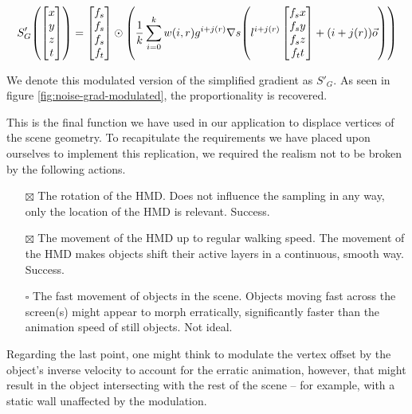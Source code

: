 \begin{equation}\label{eq:grad3}
    S'_G\mleft(\begin{bmatrix}x\\y\\z\\t\end{bmatrix}\mright) = \begin{bmatrix}f_s\\f_s\\f_s\\f_t\end{bmatrix} \odot \mleft( \frac{1}{k} \sum_{i=0}^{k} w(i, r) g^{i+j(r)} \nabla s\mleft(l^{i+j(r)} \begin{bmatrix}f_sx\\f_sy\\f_sz\\f_tt\end{bmatrix} + (i + j(r)) \vec{o}\mright) \mright)
\end{equation}

We denote this modulated version of the simplified gradient as $S'_G$. As seen in figure \ref{fig:noise-grad-modulated}, the proportionality is recovered.

This is the final function we have used in our application to displace vertices of the scene geometry. To recapitulate the requirements we have placed upon ourselves to implement this replication, we required the realism not to be broken by the following actions.

\begin{enumerate}
    \item[$\boxtimes$] The rotation of the \ac{HMD}. Does not influence the sampling in any way, only the location of the \ac{HMD} is relevant. Success.
    \item[$\boxtimes$] The movement of the \ac{HMD} up to regular walking speed. The movement of the \ac{HMD} makes objects shift their active layers in a continuous, smooth way. Success.
    \item[$\square$] The fast movement of objects in the scene. Objects moving fast across the screen(s) might appear to morph erratically, significantly faster than the animation speed of still objects. Not ideal.
\end{enumerate}

Regarding the last point, one might think to modulate the vertex offset by the object's inverse velocity to account for the erratic animation, however, that might result in the object intersecting with the rest of the scene -- for example, with a static wall unaffected by the modulation.

